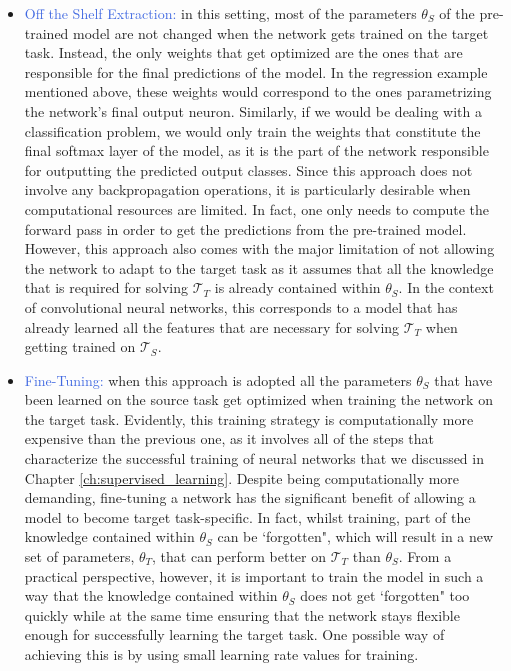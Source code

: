 \begin{itemize}
	\item \textcolor{RoyalBlue}{Off the Shelf Extraction:} in this setting, most of the parameters $\theta_S$ of the pre-trained model are not changed when the network gets trained on the target task. Instead, the only weights that get optimized are the ones that are responsible for the final predictions of the model. In the regression example mentioned above, these weights would correspond to the ones parametrizing the network's final output neuron. Similarly, if we would be dealing with a classification problem, we would only train the weights that constitute the final softmax layer of the model, as it is the part of the network responsible for outputting the predicted output classes. Since this approach does not involve any backpropagation operations, it is particularly desirable when computational resources are limited. In fact, one only needs to compute the forward pass in order to get the predictions from the pre-trained model. However, this approach also comes with the major limitation of not allowing the network to adapt to the target task as it assumes that all the knowledge that is required for solving $\mathcal{T}_T$ is already contained within $\theta_S$. In the context of convolutional neural networks, this corresponds to a model that has already learned all the features that are necessary for solving $\mathcal{T}_T$ when getting trained on $\mathcal{T}_S$.   

	\item \textcolor{RoyalBlue}{Fine-Tuning:} when this approach is adopted all the parameters $\theta_S$ that have been learned on the source task get optimized when training the network on the target task. Evidently, this training strategy is computationally more expensive than the previous one, as it involves all of the steps that characterize the successful training of neural networks that we discussed in Chapter \ref{ch:supervised_learning}. Despite being computationally more demanding, fine-tuning a network has the significant benefit of allowing a model to become target task-specific. In fact, whilst training, part of the knowledge contained within $\theta_S$ can be `forgotten", which will result in a new set of parameters, $\theta_T$, that can perform better on $\mathcal{T}_T$ than $\theta_S$. From a practical perspective, however, it is important to train the model in such a way that the knowledge contained within $\theta_S$ does not get `forgotten" too quickly while at the same time ensuring that the network stays flexible enough for successfully learning the target task. One possible way of achieving this is by using small learning rate values for training.      
\end{itemize}


